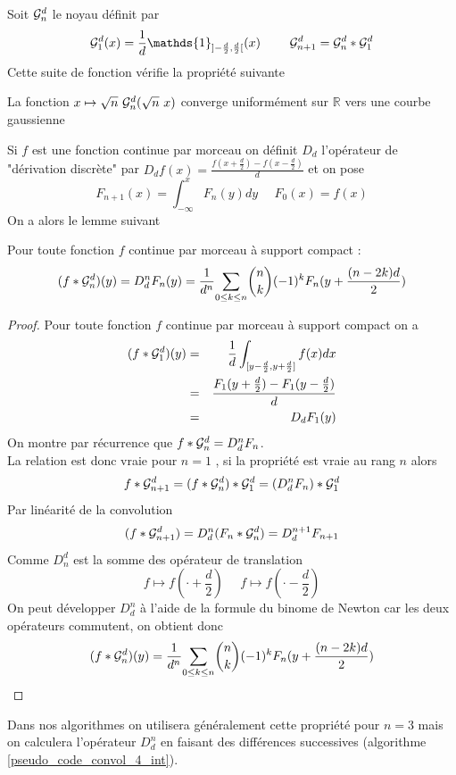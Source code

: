 Soit $\mathcal{G}_n^d$ le noyau définit par 
\begin{equation*}
\Gcal_1^d(x)=\frac{1}{d}\mathds{1}_{]-\frac{d}{2},\frac{d}{2}[}(x) ~~~~~~~\Gcal_{n+1}^d= \Gcal_n^d * \Gcal_1^d 
\label{formule_convol_n_int}
\end{equation*}
Cette suite de fonction vérifie la propriété suivante
\begin{prop}
La fonction $x\mapsto \sqrt{n}~\mathcal{G}_n^d(\sqrt{n}~x)$ converge uniformément sur $\mathbb{R}$ vers une courbe gaussienne 
\end{prop}
Si $f$ est une fonction continue par morceau on définit $D_d$ l'opérateur de "dérivation discrète" par $D_d f(x)=\frac{f(x+\frac{d}{2})-f(x-\frac{d}{2})}{d}$  et on pose
\begin{equation*}
F_{n+1}(x)= \int_{-\infty}^{x}F_{n}(y)dy~~~~~~F_{0}(x)= f(x)
\end{equation*}
On a alors le lemme suivant 
\begin{prop} Pour toute fonction $f$ continue par morceau à support compact :
\begin{equation}
 (f*\mathcal{G}_n^d)(y)=D_d^n F_{n}(y)= \frac{1}{d^n}\underset{0 \le k\le n}{\sum} \binom{n}{k}(-1)^{k} F_{n}(y+\frac{(n-2k)d}{2})
\end{equation}
\end{prop}
\begin{proof}
Pour toute fonction $f$ continue par morceau à support compact on a 
\begin{eqnarray*}
(f * \mathcal{G}_1^d )(y)&=&\frac{1}{d} \int_{[y-\frac{d}{2},y+\frac{d}{2}]} f(x) dx\\
               &=&\frac{F_{1}(y+\frac{d}{2})-F_{1}(y-\frac{d}{2})}{d}\\
               &=&D_d F_{1}(y)
\end{eqnarray*}
On montre par récurrence que $ f*\mathcal{G}_n^d=D_d^n F_{n}$.\\
La relation est donc vraie pour $n=1$ , si la propriété est vraie au rang $n$ alors
\begin{equation*}
f*\mathcal{G}_{n+1}^{d}=(f * \mathcal{G}_{n}^d) * \mathcal{G}_{1}^{d}= (D_d^n F_{n})*\mathcal{G}_1^d 
\end{equation*}
Par linéarité de la convolution
\begin{equation*}
(f*\mathcal{G}_{n+1}^{d})= D_d^n (F_{n}*\mathcal{G}_n^d) = D_d^{n+1} F_{n+1}
\end{equation*}
Comme $D_n^d$ est la somme des opérateur de translation
\begin{equation*}
f\mapsto f(\cdot+\frac{d}{2})~~~~~~f\mapsto f(\cdot-\frac{d}{2})
\end{equation*}
On peut développer $D_d^n$ à l'aide de la formule du binome de Newton car les deux opérateurs commutent, on obtient donc
\begin{equation*}
(f*\mathcal{G}_n^d)(y) = \frac{1}{d^n}\underset{0 \le k\le n}{\sum} \binom{n}{k}(-1)^{k} F_{n}(y+\frac{(n-2k)d}{2})
\end{equation*}

\end{proof}
Dans nos algorithmes  on utilisera généralement cette propriété pour $n=3$ mais on calculera l'opérateur $D_d^n$ en faisant des différences successives (algorithme \ref{pseudo_code_convol_4_int}).\\ 


